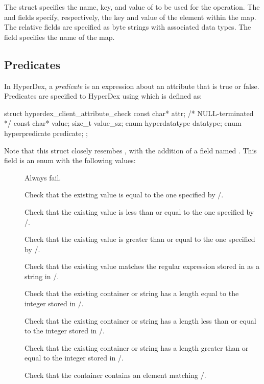 The struct specifies the name, key, and value of to be used for the operation.
The  and  fields specify, respectively, the key
and value of the element within the map.  The relative fields are specified as
byte strings with associated data types.  The  field specifies the
name of the map.

\subsection{Predicates}
\label{sec:api:c:client:predicates}

In HyperDex, a {\em predicate} is an expression about an attribute that is true
or false.  Predicates are specified to HyperDex using  which is defined as:

\begin{ccode}
struct hyperdex_client_attribute_check
{
    const char* attr; /* NULL-terminated */
    const char* value;
    size_t value_sz;
    enum hyperdatatype datatype;
    enum hyperpredicate predicate;
};
\end{ccode}

Note that this struct closely resembes , with the addition of a field named
.  This field is an enum with the following values:

\begin{description}
\item[] Always fail.
\item[] Check that the existing value is equal to
    the one specified by /.
\item[] Check that the existing value is less
    than or equal to the one specified by /.
\item[] Check that the existing value is
    greater than or equal to the one specified by /.
\item[] Check that the existing value matches the
    regular expression stored in as a string in /.
\item[] Check that the existing container
    or string has a length equal to the integer stored in
    /.
\item[] Check that the existing
    container or string has a length less than or equal to the integer stored in
    /.
\item[] Check that the existing
    container or string has a length greater than or equal to the integer stored
    in /.
\item[] Check that the container contains an
    element matching /.
\end{description}

